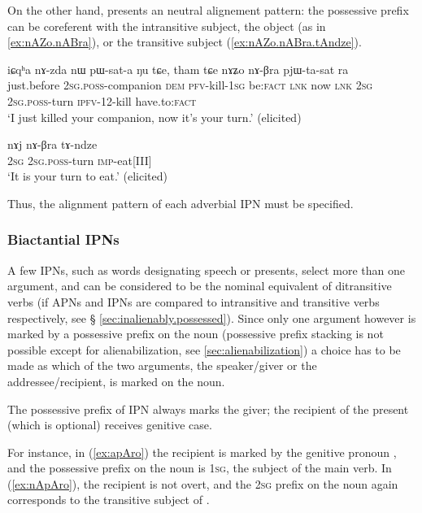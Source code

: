 On the other hand,  presents an neutral alignement pattern: the possessive prefix can be coreferent with the intransitive subject, the object (as in \ref{ex:nAZo.nABra}), or the transitive subject (\ref{ex:nAZo.nABra.tAndze}).


\begin{exe}
\ex \label{ex:nAZo.nABra}
\gll iɕqʰa nɤ-zda nɯ pɯ-sat-a ŋu tɕe, tham tɕe nɤʑo nɤ-βra pjɯ-ta-sat ra \\
just.before \textsc{2sg}.\textsc{poss}-companion \textsc{dem} \textsc{pfv}-kill-\textsc{1sg} be:\textsc{fact} \textsc{lnk} now \textsc{lnk} \textsc{2sg} \textsc{2sg}.\textsc{poss}-turn \textsc{ipfv}-1\fl{}2-kill have.to:\textsc{fact} \\
\glt `I just killed your companion, now it's your turn.' (elicited)
\end{exe}

\begin{exe}
\ex \label{ex:nAZo.nABra.tAndze}
\gll nɤj nɤ-βra tɤ-ndze  \\
\textsc{2sg} \textsc{2sg}.\textsc{poss}-turn \textsc{imp}-eat[III] \\
\glt `It is your turn to eat.' (elicited)
\end{exe}

Thus, the alignment pattern of each adverbial IPN must be specified.

\subsubsection{Biactantial IPNs}
A few IPNs, such as words designating speech or presents, select more than one argument, and can be considered to be the nominal equivalent of ditransitive verbs (if APNs and IPNs are compared to intransitive and transitive verbs respectively, see § \ref{sec:inalienably.possessed}). Since only one argument however is marked by a possessive prefix on the noun (possessive prefix stacking is not possible except for alienabilization, see \ref{sec:alienabilization}) a choice has to be made as which of the two arguments, the speaker/giver or the addressee/recipient, is marked on the noun.

The possessive prefix of IPN  always marks the giver; the recipient of the present (which is optional) receives genitive case. 

For instance, in (\ref{ex:apAro}) the recipient is marked by the genitive pronoun , and the possessive prefix on the noun is \textsc{1sg}, the subject of the main verb. In (\ref{ex:nApAro}), the recipient is not overt, and the \textsc{2sg} prefix on the noun again corresponds to the transitive subject of .

